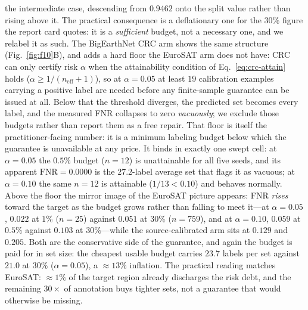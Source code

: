 \documentclass[preprint,11pt,authoryear]{elsarticle}
\begin{document}
the intermediate case, descending from $0.9462$ onto the split value rather than rising above it.
The practical consequence is a deflationary one for the $30\%$ figure the report card quotes: it is a
\emph{sufficient} budget, not a necessary one, and we relabel it as such.
The BigEarthNet CRC arm shows the same structure (Fig.~\ref{fig:f10}B), and adds a hard floor the EuroSAT arm does not
have: CRC can only certify risk $\alpha$ when the attainability condition of Eq.~\eqref{eq:crc-attain}
holds ($\alpha \ge 1/(n_\mathrm{eff}{+}1)$), so at
$\alpha{=}0.05$ at least $19$ calibration examples carrying a positive label are needed before any
finite-sample guarantee can be issued at all. Below that the threshold diverges, the predicted set
becomes every label, and the measured FNR collapses to zero \emph{vacuously}; we exclude those budgets
rather than report them as a free repair. That floor is itself the practitioner-facing number: it is a
minimum labeling budget below which the guarantee is unavailable at any price. It binds in exactly one
swept cell: at $\alpha{=}0.05$ the $0.5\%$ budget ($n{=}12$) is unattainable for all five seeds, and its
apparent $\mathrm{FNR}{=}0.0000$ is the $27.2$-label average set that flags it as vacuous; at
$\alpha{=}0.10$ the same $n{=}12$ is attainable ($1/13 < 0.10$) and behaves normally. Above the floor
the mirror image of the EuroSAT picture appears: FNR \emph{rises} toward the target as the budget grows
rather than falling to meet it---at $\alpha{=}0.05$, $0.022$ at $1\%$ ($n{=}25$) against $0.051$ at
$30\%$ ($n{=}759$), and at $\alpha{=}0.10$, $0.059$ at $0.5\%$ against $0.103$ at $30\%$---while the
source-calibrated arm sits at $0.129$ and $0.205$. Both are the conservative side of the guarantee, and
again the budget is paid for in set size: the cheapest usable budget carries $23.7$ labels per set
against $21.0$ at $30\%$ ($\alpha{=}0.05$), a ${\approx}13\%$ inflation. The practical reading matches
EuroSAT: ${\approx}1\%$ of the target region already discharges the risk debt, and the remaining $30\times$
of annotation buys tighter sets, not a guarantee that would otherwise be missing.
\end{document}
